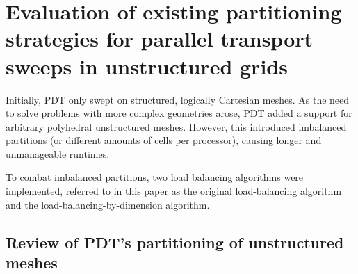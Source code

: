 \documentclass[times,final]{elsarticle}
\begin{document}
\section{Evaluation of existing partitioning strategies for parallel transport sweeps in unstructured grids}\label{cha:lb}
 
Initially, PDT only swept on structured, logically Cartesian meshes. As the need to solve problems with more complex geometries arose, PDT added a support for arbitrary polyhedral unstructured meshes. However, this introduced imbalanced partitions (or different amounts of cells per processor), causing longer and unmanageable runtimes.

To combat imbalanced partitions, two load balancing algorithms were implemented, referred to in this paper as the original load-balancing algorithm \cite{mastersthesis,mc2017} and the load-balancing-by-dimension algorithm.

\subsection{Review of PDT's partitioning of unstructured meshes}
\end{document}
